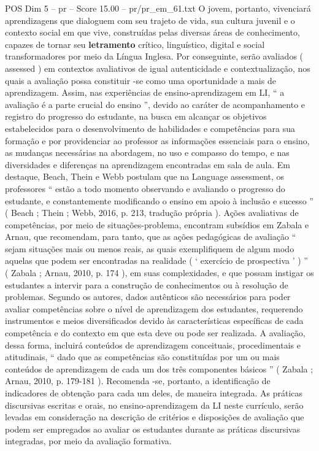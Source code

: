 \begin{textsample}{POS Dim 5 – pr – Score 15.00 – pr/pr\_em\_61.txt}
O jovem, portanto, vivenciará aprendizagens que dialoguem com seu trajeto de vida, sua cultura juvenil e o contexto social em que vive, construídas pelas diversas áreas de conhecimento, capazes de tornar seu \textbf{letramento} crítico, linguístico, digital e social transformadores por meio da Língua Inglesa.
Por conseguinte, serão avaliados ( assessed ) em contextos avaliativos de igual autenticidade e contextualização, nos quais a avaliação possa constituir -se como uma oportunidade a mais de aprendizagem.
Assim, nas experiências de ensino-aprendizagem em LI, “ a avaliação é a parte crucial do ensino ”, devido ao caráter de acompanhamento e registro do progresso do estudante, na busca em alcançar os objetivos estabelecidos para o desenvolvimento de habilidades e competências para sua formação e por providenciar ao professor as informações essenciais para o ensino, as mudanças necessárias na abordagem, no uso e compasso do tempo, e nas diversidades e diferenças na aprendizagem encontradas em sala de aula.
Em destaque, Beach, Thein e Webb postulam que na Language assessment, os professores “ estão a todo momento observando e avaliando o progresso do estudante, e constantemente modificando o ensino em apoio à inclusão e sucesso ” ( Beach ; Thein ; Webb, 2016, p. 213, tradução própria ).
Ações avaliativas de competências, por meio de situações-problema, encontram subsídios em Zabala e Arnau, que recomendam, para tanto, que as ações pedagógicas de avaliação “ sejam situações mais ou menos reais, as quais exemplifiquem de algum modo aquelas que podem ser encontradas na realidade ( ‘ exercício de prospectiva ’ ) ” ( Zabala ; Arnau, 2010, p. 174 ), em suas complexidades, e que possam instigar os estudantes a intervir para a construção de conhecimentos ou à resolução de problemas.
Segundo os autores, dados autênticos são necessários para poder avaliar competências sobre o nível de aprendizagem dos estudantes, requerendo instrumentos e meios diversificados devido às características específicas de cada competência e do contexto em que esta deve ou pode ser realizada.
A avaliação, dessa forma, incluirá conteúdos de aprendizagem conceituais, procedimentais e atitudinais, “ dado que as competências são constituídas por um ou mais conteúdos de aprendizagem de cada um dos três componentes básicos ” ( Zabala ; Arnau, 2010, p. 179-181 ).
Recomenda -se, portanto, a identificação de indicadores de obtenção para cada um deles, de maneira integrada.
As práticas discursivas escritas e orais, no ensino-aprendizagem da LI neste currículo, serão levadas em consideração na descrição de critérios e disposições de avaliação que podem ser empregados ao avaliar os estudantes durante as práticas discursivas integradas, por meio da avaliação formativa.

\end{textsample}

